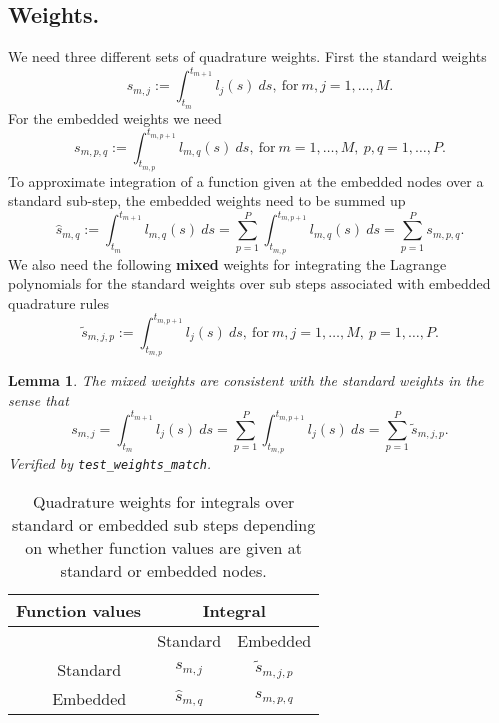 \documentclass{article}
\newtheorem{lemma}{Lemma}
\begin{document}
\subsection*{Weights.}
We need three different sets of quadrature weights.
First the standard weights
\begin{equation}
	s_{m,j} := \int_{t_{m}}^{t_{m+1}} l_{j}(s)~ds, \ \text{for} \ m,j=1,\ldots,M.
\end{equation}
For the embedded weights we need
\begin{equation}
	s_{m,p,q} := \int_{t_{m,p}}^{t_{m,p+1}} l_{m,q}(s)~ds, \ \text{for} \ m=1,\ldots,M, \ p,q=1,\ldots,P.
\end{equation}
To approximate integration of a function given at the embedded nodes over a standard sub-step, the embedded weights need to be summed up
\begin{equation}
	\hat{s}_{m,q} := \int_{t_{m}}^{t_{m+1}} l_{m,q}(s)~ds = \sum_{p=1}^{P} \int_{t_{m,p}}^{t_{m,p+1}} l_{m,q}(s)~ds = \sum_{p=1}^{P} s_{m,p,q}.
\end{equation}
We also need the following \textbf{mixed} weights for integrating the Lagrange polynomials for the standard weights over sub steps associated with embedded quadrature rules
\begin{equation}
	\tilde{s}_{m,j,p} := \int_{t_{m,p}}^{t_{m,p+1}} l_{j}(s)~ds, \ \text{for} \ m,j=1,\ldots,M, \ p=1,\ldots,P.
\end{equation}
\begin{lemma}\label{lemma:weights_match}
The mixed weights are consistent with the standard weights in the sense that
\begin{equation}
	s_{m,j} = \int_{t_m}^{t_{m+1}} l_j(s)~ds = \sum_{p=1}^{P} \int_{t_{m,p}}^{t_{m,p+1}} l_j(s)~ds = \sum_{p=1}^{P} \tilde{s}_{m,j,p}.
\end{equation}
Verified by \texttt{test\_weights\_match}.
\end{lemma}

\begin{table}[h]
\centering
\begin{tabular}{|cc|cc|} \hline
\multicolumn{2}{|c|}{Function values} & \multicolumn{2}{c|}{Integral} \\ \hline
&          & Standard        & Embedded            \\ \hline
& Standard & $s_{m,j}$       & $\tilde{s}_{m,j,p}$ \\
& Embedded & $\hat{s}_{m,q}$ & $s_{m,p,q}$ \\ \hline
\end{tabular}
\caption{Quadrature weights for integrals over standard or embedded sub steps depending on whether function values are given at standard or embedded nodes.}
\end{table}
\end{document}
